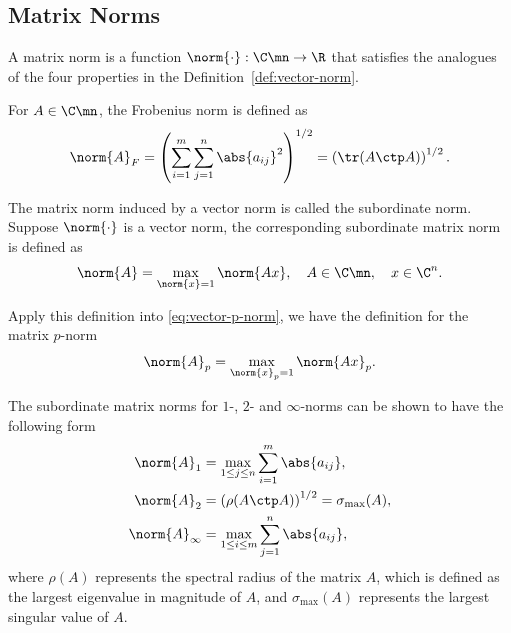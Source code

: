 \documentclass{article}
\numberwithin{equation}{section} %
\newcommand{\gnorm}[1]{\norm{#1}}
\begin{document}
\subsection{Matrix Norms} \label{subsec:matrix-norms}
\begin{definition} 
A matrix norm is a function $\gnorm{\cdot}:\C\mn \to \R$ that satisfies the
analogues of the four properties in the Definition~\ref{def:vector-norm}.
\end{definition}

\begin{example}
    For $A\in\C\mn$, the Frobenius norm is defined as
    \begin{equation}
      \notag
      \gnorm{A}_F = \left(\sum_{i = 1}^m \sum_{j = 1}^n \abs{a_{ij}}^2\right)^{1/2} = \left(\tr(A\ctp A)\right)^{1/2}.
    \end{equation}
    \end{example}

\begin{example}
    The matrix norm induced by a vector norm is called the subordinate
    norm. Suppose $\gnorm{\cdot}$ is a vector norm, the corresponding
    subordinate matrix norm is defined as
    \begin{equation}
      \notag 
      \gnorm{A} = \max_{\gnorm{x} = 1} \gnorm{Ax}, \quad A \in \C\mn, \quad x \in \C^n.
    \end{equation}

    Apply this definition into \eqref{eq:vector-p-norm}, we have the
    definition for the matrix $p$-norm
    \begin{equation}
      \notag 
      \gnorm{A}_p = \max_{\gnorm{x}_p = 1} \gnorm{Ax}_{p}.
    \end{equation}

    The subordinate matrix norms for $1$-, $2$- and $\infty$-norms can be
    shown to have the following form
    \begin{equation}
      \notag 
      \begin{aligned}
        \gnorm{A}_1 &= \max_{1\leq j \leq n} \sum_{i = 1}^m \abs{a_{ij}}, \\
        \gnorm{A}_2 &= \left(\rho(A\ctp A)\right)^{1/2} = \sigma_{\max}(A),\\
        \gnorm{A}_\infty & = \max_{1 \leq i \leq m} \sum_{j = 1}^n \abs{a_{ij}},
      \end{aligned}
    \end{equation}
    where $\rho(A)$ represents the spectral radius of the matrix $A$, which
    is defined as the largest eigenvalue in magnitude of $A$, and
    $\sigma_{\max}(A)$ represents the largest singular value of $A$.
    \end{example}
\end{document}
